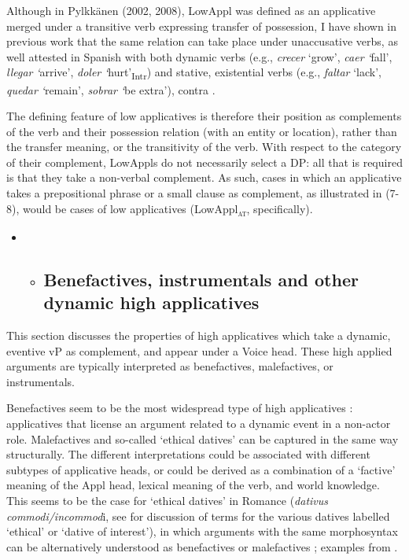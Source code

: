 \documentclass[output=paper,modfonts,nonflat]{langsci/langscibook}
\begin{document}
Although in Pylkkänen (2002, 2008), LowAppl was defined as an applicative merged under a transitive verb expressing transfer of possession, I have shown in previous work that the same relation can take place under unaccusative verbs, as well attested in Spanish with both dynamic verbs (e.g., \textit{crecer} ‘grow’, \textit{caer} \textit{‘}fall’, \textit{llegar} \textit{‘}arrive’, \textit{doler} \textit{‘}hurt’\textsubscript{Intr}) and stative, existential verbs (e.g., \textit{faltar} ‘lack’, \textit{quedar} \textit{‘}remain’, \textit{sobrar} \textit{‘}be extra’), contra \citet{Baker1996}. 

The defining feature of low applicatives is therefore their position as complements of the verb and their possession relation (with an entity or location), rather than the transfer meaning, or the transitivity of the verb. With respect to the category of their complement, LowAppls do not necessarily select a DP: all that is required is that they take a non-verbal complement. As such, cases in which an applicative takes a prepositional phrase or a small clause as complement, as illustrated in (7-8), would be cases of low applicatives (LowAppl\textsc{\textsubscript{at}}, specifically).

\begin{itemize}
\item \begin{itemize}
\item \subsection{Benefactives, instrumentals and other dynamic high applicatives}
\end{itemize}
\end{itemize}

This section discusses the properties of high applicatives which take a dynamic, eventive vP as complement, and appear under a Voice head. These high applied arguments are typically interpreted as benefactives, malefactives, or instrumentals. 

Benefactives seem to be the most widespread type of high applicatives \citep{Polinsky2013}: applicatives that license an argument related to a dynamic event in a non-actor role. Malefactives and so-called ‘ethical datives’ can be captured in the same way structurally. The different interpretations could be associated with different subtypes of applicative heads, or could be derived as a combination of a ‘factive’ meaning of the Appl head, lexical meaning of the verb, and world knowledge. This seems to be the case for ‘ethical datives’ in Romance (\textit{dativus} \textit{commodi/incommod}i, see \citealt{RobergeTroberg2009} for discussion of terms for the various datives labelled ‘ethical’ or ‘dative of interest’), in which arguments with the same morphosyntax can be alternatively understood as benefactives  or malefactives ; examples from \citealt{RobergeTroberg2009}.
\end{document}
